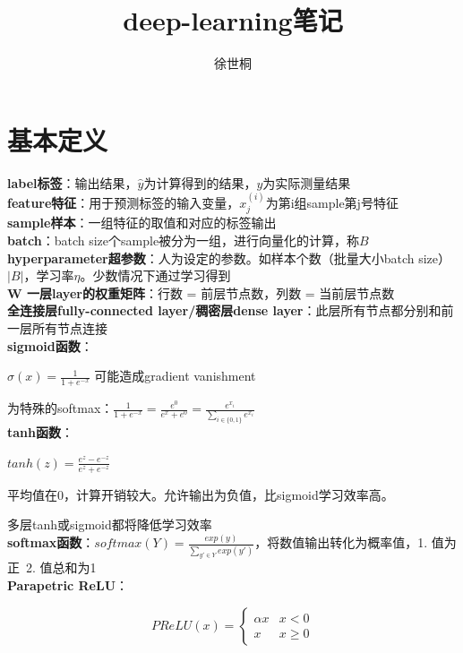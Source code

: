 \documentclass[UTF8]{ctexart}
\title{deep-learning笔记}
\author{徐世桐}
\date{}
\begin{document}
\maketitle

\section{基本定义}

\noindent \textbf{label标签}：输出结果，$\hat{y} $为计算得到的结果，$y$为实际测量结果\\
\textbf{feature特征}：用于预测标签的输入变量，$x^{(i)}_j$为第i组sample第j号特征\\
\textbf{sample样本}：一组特征的取值和对应的标签输出\\
\textbf{batch}：batch size个sample被分为一组，进行向量化的计算，称$B$\\
\textbf{hyperparameter超参数}：人为设定的参数。如样本个数（批量大小batch size）$|B|$，学习率$\eta $。少数情况下通过学习得到\\
\textbf{W 一层layer的权重矩阵}：行数 = 前层节点数，列数 = 当前层节点数\\
\textbf{全连接层fully-connected layer/稠密层dense layer}：此层所有节点都分别和前一层所有节点连接\\
\textbf{sigmoid函数}：

  $\sigma(x) = \frac{1}{1+e^{-x}}$ 可能造成gradient vanishment
  
  为特殊的softmax：$\frac{1}{1+e^{-x}} = \frac{e^0}{e^x + e^0} = \frac{e^{x_i}}{\sum_{i \in \{0, 1\}} e^{x_i}}$\\
\textbf{tanh函数}：

  $tanh(z) = \frac{e^z - e^{-z}}{e^z + e^{-z}}$ 

  平均值在0，计算开销较大。允许输出为负值，比sigmoid学习效率高。
  
  多层tanh或sigmoid都将降低学习效率\\
\textbf{softmax函数}：$softmax(Y) = \frac{exp(y)}{\sum_{y' \in Y} exp(y') } $，将数值输出转化为概率值，1. 值为正\ 2. 值总和为1\\
\textbf{Parapetric ReLU}：

  \begin{equation*}
    PReLU(x) = \begin{cases}
      \alpha x & x < 0\\
      x & x \geq 0
    \end{cases}
  \end{equation*}
  
\end{document}
